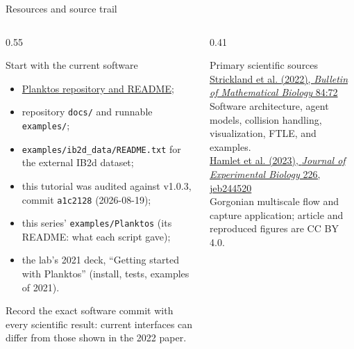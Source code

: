 \documentclass[aspectratio=169,11pt]{beamer}
\begin{document}
\begin{frame}{Resources and source trail}
\begin{columns}[T,onlytextwidth]
\begin{column}{0.55\textwidth}
\begin{block}{Start with the current software}
\small
\begin{itemize}\itemsep1pt
  \item \href{https://github.com/mountaindust/Planktos}{Planktos repository and README};
  \item repository \texttt{docs/} and runnable \texttt{examples/};
  \item \texttt{examples/ib2d\_data/README.txt} for the external IB2d dataset;
  \item this tutorial was audited against v1.0.3, commit \texttt{a1c2128} (2026-08-19);
  \item this series' \texttt{examples/Planktos} (its README: what each script gave);
  \item the lab's 2021 deck, ``Getting started with Planktos'' (install, tests, examples of 2021).
\end{itemize}
\end{block}
\begin{punchbox}
\centering\small
Record the exact software commit with every scientific result: current interfaces can differ from those shown in the 2022 paper.
\end{punchbox}
\end{column}
\begin{column}{0.41\textwidth}
\begin{block}{Primary scientific sources}
\small
\href{https://doi.org/10.1007/s11538-022-01027-1}{Strickland et al. (2022), \emph{Bulletin of Mathematical Biology} 84:72}\\[8pt]
Software architecture, agent models, collision handling, visualization, FTLE, and examples.\\[10pt]
\href{https://doi.org/10.1242/jeb.244520}{Hamlet et al. (2023), \emph{Journal of Experimental Biology} 226, jeb244520}\\[8pt]
Gorgonian multiscale flow and capture application; article and reproduced figures are CC BY 4.0.
\end{block}
\end{column}
\end{columns}
\end{frame}
\end{document}
